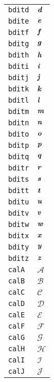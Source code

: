 \begin{longtable}{ll}
\texttt{bditd}&${}\textbf{\textit{d}}{}$\\
\texttt{bdite}&${}\textbf{\textit{e}}{}$\\
\texttt{bditf}&${}\textbf{\textit{f}}{}$\\
\texttt{bditg}&${}\textbf{\textit{g}}{}$\\
\texttt{bdith}&${}\textbf{\textit{h}}{}$\\
\texttt{bditi}&${}\textbf{\textit{i}}{}$\\
\texttt{bditj}&${}\textbf{\textit{j}}{}$\\
\texttt{bditk}&${}\textbf{\textit{k}}{}$\\
\texttt{bditl}&${}\textbf{\textit{l}}{}$\\
\texttt{bditm}&${}\textbf{\textit{m}}{}$\\
\texttt{bditn}&${}\textbf{\textit{n}}{}$\\
\texttt{bdito}&${}\textbf{\textit{o}}{}$\\
\texttt{bditp}&${}\textbf{\textit{p}}{}$\\
\texttt{bditq}&${}\textbf{\textit{q}}{}$\\
\texttt{bditr}&${}\textbf{\textit{r}}{}$\\
\texttt{bdits}&${}\textbf{\textit{s}}{}$\\
\texttt{bditt}&${}\textbf{\textit{t}}{}$\\
\texttt{bditu}&${}\textbf{\textit{u}}{}$\\
\texttt{bditv}&${}\textbf{\textit{v}}{}$\\
\texttt{bditw}&${}\textbf{\textit{w}}{}$\\
\texttt{bditx}&${}\textbf{\textit{x}}{}$\\
\texttt{bdity}&${}\textbf{\textit{y}}{}$\\
\texttt{bditz}&${}\textbf{\textit{z}}{}$\\
\texttt{calA}&${}\mathcal{A}{}$\\
\texttt{calB}&${}\mathcal{B}{}$\\
\texttt{calC}&${}\mathcal{C}{}$\\
\texttt{calD}&${}\mathcal{D}{}$\\
\texttt{calE}&${}\mathcal{E}{}$\\
\texttt{calF}&${}\mathcal{F}{}$\\
\texttt{calG}&${}\mathcal{G}{}$\\
\texttt{calH}&${}\mathcal{H}{}$\\
\texttt{calI}&${}\mathcal{I}{}$\\
\texttt{calJ}&${}\mathcal{J}{}$\\

\end{longtable}
